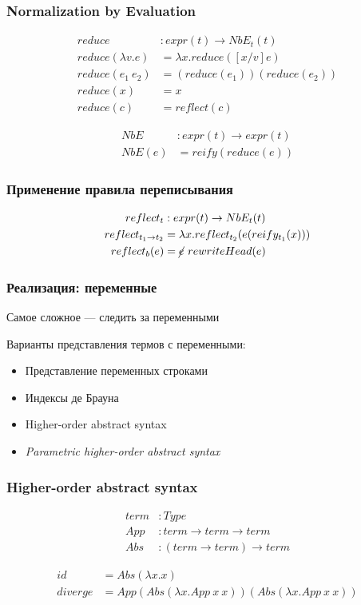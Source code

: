 \documentclass[xcolor=table]{beamer}
\begin{document}
\begin{frame}[fragile]
  \transwipe[direction=90]
  \frametitle{Normalization by Evaluation}
\begin{align*}
  reduce &: expr(t) \rightarrow NbE_t(t) \\
  reduce(\lambda v. e) &= \lambda x . reduce ([x / v] e) \\
  reduce(e_1 \ e_2) &= (reduce(e_1)) (reduce(e_2)) \\
  reduce(x) &= x \\
  reduce(c) &= reflect(c)
\end{align*}

\begin{align*}
  NbE &: expr(t) \rightarrow expr(t) \\
  NbE(e) &= reify(reduce(e))
\end{align*}
\end{frame}

\begin{frame}[fragile]
  \transwipe[direction=90]
  \frametitle{Применение правила переписывания}
\begin{align*}
  reflect_t &: expr(t) \rightarrow NbE_t(t) \\
  reflect_{t_1 \rightarrow t_2} &= \lambda x. reflect_{t_2}(e(reify_{t_1}(x))) \\
  reflect_b(e) &= \cancel{e} \ rewriteHead(e)
\end{align*}
\end{frame}

\begin{frame}[fragile]
  \transwipe[direction=90]
  \frametitle{Реализация: переменные}
\begin{center}
  Самое сложное --- следить за переменными
\end{center}
  \bigskip
\begin{center}
  Варианты представления термов с переменными:
\end{center}

\begin{itemize}
  \item Представление переменных строками
  \item Индексы де Брауна
  \item Higher-order abstract syntax
  \item \emph{Parametric higher-order abstract syntax}
\end{itemize}
\end{frame}

\begin{frame}[fragile]
  \transwipe[direction=90]
  \frametitle{Higher-order abstract syntax}
\begin{align*}
  term &: Type \\
  App  &: term \rightarrow term \rightarrow term \\
  Abs  &: (term \rightarrow term) \rightarrow term
\end{align*}

\begin{align*}
  id &= Abs (\lambda x . x ) \\
  diverge &= App (Abs (\lambda x . App \ x \ x)) (Abs (\lambda x . App \  x \ x))
\end{align*}
\end{frame}
\end{document}
